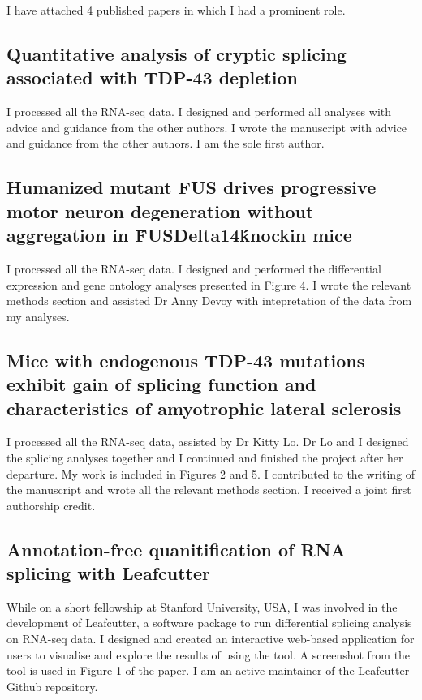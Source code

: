 \begin{appendices}
I have attached 4 published papers in which I had a prominent role.


\subsection{Quantitative analysis of cryptic splicing associated with TDP-43 depletion}

I processed all the RNA-seq data. I designed and performed all analyses with advice and guidance from the other authors. I wrote the manuscript with advice and guidance from the other authors. I am the sole first author.

\subsection{Humanized mutant FUS drives progressive motor neuron degeneration without aggregation in \'FUSDelta14\' knockin mice}

I processed all the RNA-seq data. I designed and performed the differential expression and gene ontology analyses presented in Figure 4. I wrote the relevant methods section and assisted Dr Anny Devoy with intepretation of the data from my analyses.

\subsection{Mice with endogenous TDP-43 mutations exhibit gain of splicing function and characteristics of amyotrophic lateral sclerosis}

I processed all the RNA-seq data, assisted by Dr Kitty Lo. Dr Lo and I designed the splicing analyses together and I continued and finished the project after her departure. My work is included in Figures 2 and 5. I contributed to the writing of the manuscript and wrote all the relevant methods section. I received a joint first authorship credit.

\subsection{Annotation-free quanitification of RNA splicing with Leafcutter}

While on a short fellowship at Stanford University, USA, I was involved in the development of Leafcutter, a software package to run differential splicing analysis on RNA-seq data. I designed and created an interactive web-based application for users to visualise and explore the results of using the tool. A screenshot from the tool is used in Figure 1 of the paper. I am an active maintainer of the Leafcutter Github repository.

\clearpage






\end{appendices}